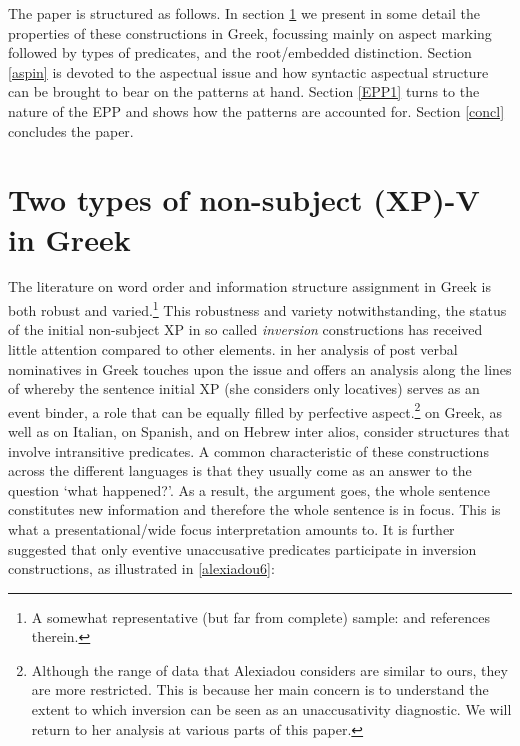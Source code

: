 \documentclass[11pt]{article}
\begin{document}
The paper is structured as follows.  In section \ref{Greeksection} we present in some detail the properties of these constructions in Greek, focussing mainly on aspect marking followed by types of predicates, and the root/embedded distinction. Section \ref{aspin} is devoted to the aspectual issue and how syntactic aspectual structure can be brought to bear on the patterns at hand.  Section \ref{EPP1} turns to the nature of the EPP and shows how the patterns are accounted for. Section \ref{concl} concludes the paper.




\section{Two types of non-subject (XP)-V in Greek} \label{Greeksection}

The literature on word order and information structure assignment in Greek is both robust and varied.\footnote{A somewhat representative (but far from complete) sample: \citet{alexiadou:99,alexiadou:00,spyropoulos-philippaki:01,georgiafentis:03,sifaki:03,roussou-tsimpli:06,gryllia:08,kechagias:10,haidou:12} and references therein.}  This robustness and variety notwithstanding, the status of the initial non-subject XP in so called \textit{inversion} constructions has received little attention compared to other elements.  \citet{alexiadou:07}  in her analysis of post verbal nominatives in Greek touches upon the issue and offers an analysis along the lines of \citet{borer:05a} whereby the sentence initial XP (she considers only locatives) serves as an event binder, a role that can be equally filled by perfective aspect.\footnote{Although the range of data that Alexiadou considers are similar to ours, they are more restricted.  This is because her main concern is to understand the extent to which inversion can be seen as an unaccusativity diagnostic. We will return to her analysis at various parts of this paper.}  \citet{alexiadou:96,alexiadou:07} on Greek, as well as \citet{pinto:97} on Italian, \citet{torrego:89} on Spanish, and \citet{borer:05a} on Hebrew inter alios, consider structures that involve intransitive predicates.  
A common characteristic of these constructions across the different languages is that they usually come as an answer to the question `what happened?'. As a result, the argument goes, the whole sentence constitutes new information and therefore the whole sentence is in focus.  This is what a presentational/wide focus interpretation amounts to.  It is further suggested that only eventive unaccusative predicates participate in inversion constructions, as illustrated in \ref{alexiadou6}:
\end{document}

